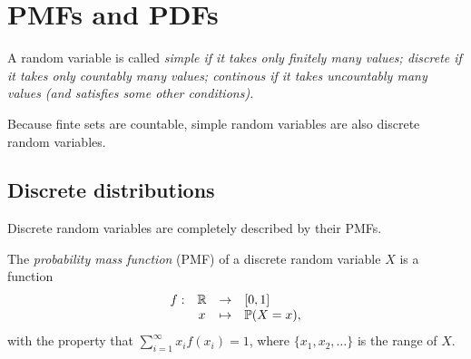 
\section{PMFs and PDFs}\label{sec:pmfs_pdfs}

\begin{definition}
A random variable is called
\ben
\it \emph{simple} if it takes only finitely many values;
\it \emph{discrete} if it takes only countably many values;
\it \emph{continous} if it takes uncountably many values (and satisfies some other conditions).
\een
\end{definition}
Because finte sets are countable, simple random variables are also discrete random variables.
\subsection{Discrete distributions}

Discrete random variables are completely described by their PMFs.
\begin{definition}\label{def:pmf}
The \emph{probability mass function} (PMF) of a discrete random variable $X$ is a function
\[
\begin{array}{rccl}
f:	& \mathbb{R}	& \to 		& [0,1] \\
	& x		& \mapsto 	& \mathbb{P} (X=x),
\end{array}
\]
with the property that $\sum_{i=1}^{\infty}x_i f(x_i) = 1$, where $\{x_1,x_2,\ldots\}$ is the range of $X$.
\end{definition}

